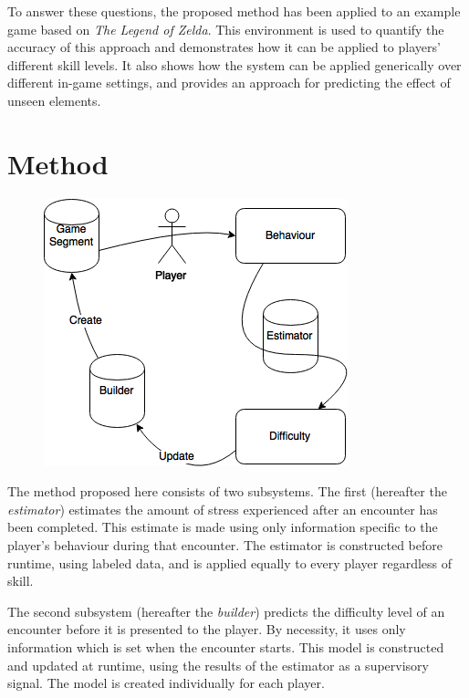 \documentclass[a4paper]{article}
\begin{document}
\begin{multicols*}{2}
To answer these questions, the proposed method has been applied to an example game based on \emph{The Legend of Zelda}. This environment is used to quantify the accuracy of this approach and demonstrates how it can be applied to players' different skill levels. It also shows how the system can be applied generically over different in-game settings, and provides an approach for predicting the effect of unseen elements.

\section{Method}
\centering
\begin{figure}[t]
\centering
\includegraphics[width=\textwidth]{processflowchart}
\end{figure}

The method proposed here consists of two subsystems. The first (hereafter the \emph{estimator}) estimates the amount of stress experienced after an encounter has been completed. This estimate is made using only information specific to the player's behaviour during that encounter. The estimator is constructed before runtime, using labeled data, and is applied equally to every player regardless of skill.

The second subsystem (hereafter the \emph{builder}) predicts the difficulty level of an encounter before it is presented to the player. By necessity, it uses only information which is set when the encounter starts. This model is constructed and updated at runtime, using the results of the estimator as a supervisory signal. The model is created individually for each player.


\end{multicols*}
\end{document}
